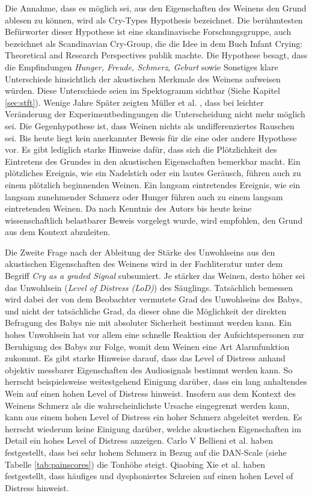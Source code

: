 Die Annahme, dass es möglich sei, aus den Eigenschaften des Weinens den Grund ablesen zu können, wird als \glqq Cry-Types Hypothesis\grqq{} bezeichnet. Die berühmtesten Befürworter dieser Hypothese ist eine skandinavische Forschungsgruppe, auch bezeichnet als \glqq Scandinavian Cry-Group\grqq , die die Idee in dem Buch \glqq Infant Crying: Theoretical and Research Perspectives\grqq \cite{crygroup} publik machte. Die Hypothese besagt, dass die Empfindungen \emph{Hunger, Freude, Schmerz, Geburt} sowie {Sonstiges} klare Unterschiede hinsichtlich der akustischen Merkmale des Weinens aufweisen würden. Diese Unterschiede seien im Spektogramm sichtbar (Siehe Kapitel \ref{sec:stft}). Wenige Jahre Später zeigten Müller et al. \cite{cryisnoise}, dass bei leichter Veränderung der Experimentbedingungen die Unterscheidung nicht mehr möglich sei. Die Gegenhypothese ist, dass Weinen \glqq nichts als undifferenziertes Rauschen\grqq{} sei. Bis heute liegt kein anerkannter Beweis für die eine oder andere Hypothese vor. Es gibt lediglich starke Hinweise dafür, dass sich die Plötzlichkeit des Eintretens des Grundes in den akustischen Eigenschaften bemerkbar macht. Ein plötzliches Ereignis, wie ein Nadelstich oder ein lautes Geräusch, führen auch zu einem plötzlich beginnenden Weinen. Ein langsam eintretendes Ereignis, wie ein langsam zunehmender Schmerz oder Hunger führen auch zu einem langsam eintretenden Weinen. Da nach Kenntnis des Autors bis heute keine wissenschaftlich belastbarer Beweis vorgelegt wurde, wird empfohlen, den Grund aus dem Kontext abzuleiten.\cite[S. 9 - 13, 17 - 19]{signal}

Die Zweite Frage nach der Ableitung der Stärke des Unwohlseins aus den akustischen Eigenschaften des Weinens wird in der Fachliteratur unter dem Begriff \emph{Cry as a graded Signal} subsumiert. Je \glqq stärker\grqq{} das Weinen, desto höher sei das Unwohlsein (\emph{Level of Distress (LoD)}) des Säuglings. Tatsächlich bemessen wird dabei der von dem Beobachter vermutete Grad des Unwohlseins des Babys, und nicht der tatsächliche Grad, da dieser ohne die Möglichkeit der direkten Befragung des Babys nie mit absoluter Sicherheit bestimmt werden kann. Ein hohes Unwohlsein hat vor allem eine schnelle Reaktion der Aufsichtspersonen zur Beruhigung des Babys zur Folge, womit dem Weinen eine Art Alarmfunktion zukommt. Es gibt starke Hinweise darauf, dass das Level of Distress anhand objektiv messbarer Eigenschaften des Audiosignals bestimmt werden kann. So herrscht beispielsweise weitestgehend Einigung darüber, dass ein \glqq lang\grqq{} anhaltendes Wein auf einen hohen Level of Distress hinweist. Insofern aus dem Kontext des Weinens Schmerz als die wahrscheinlichste Ursache eingegrenzt werden kann, kann aus einem hohen Level of Distress ein hoher Schmerz abgeleitet werden. \cite[S. 13 - 17]{signal} \cite{lod} Es herrscht wiederum keine Einigung darüber, welche akustischen Eigenschaften im Detail ein hohes Level of Distress anzeigen. Carlo V Bellieni et al. \cite{dan} haben festgestellt, dass bei sehr hohem Schmerz in Bezug auf die DAN-Scale (siehe Tabelle \ref{tab:painscores}) die Tonhöhe steigt. Qiaobing Xie et al. \cite{lod} haben festgestellt, dass häufiges und dysphoniertes Schreien auf einen hohen Level of Distress hinweist.




